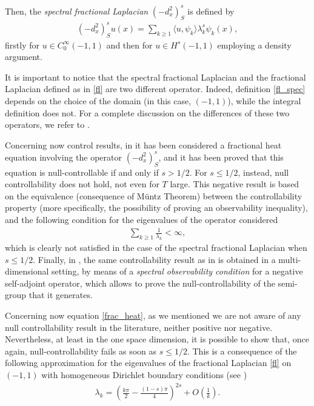 Then, the \textit{spectral fractional Laplacian} $(-d_x^2)^s_S$ is defined by
\begin{align}\label{fl_spec}
	(-d_x^2)^s_S u(x) = \sum_{k\geq 1}\langle u,\psi_k\rangle \lambda_k^s\psi_k(x),
\end{align}
firstly for $u\in C_0^{\infty}(-1,1)$ and then for $u\in H^s(-1,1)$ employing a density argument.

It is important to notice that the spectral fractional Laplacian and the fractional Laplacian defined as in \eqref{fl} are two different operator. Indeed, definition \eqref{fl_spec} depends on the choice of the domain (in this case, $(-1,1)$), while the integral definition does not. For a complete discussion on the differences of these two operators, we refer to \cite{servadei2014spectrum}.

Concerning now control results, in \cite{micu2006controllability} it has been considered a fractional heat equation involving the operator $(-d_x^2)^s_S$, and it has been proved that this equation is null-controllable if and only if $s>1/2$. For $s\leq 1/2$, instead, null controllability does not hold, not even for $T$ large. This negative result is based on the equivalence (consequence of M\"untz Theorem) between the controllability property (more specifically, the possibility of proving an observability inequality), and the following condition for the eigenvalues of the operator considered
\begin{align}\label{eigen_cond}
	\sum_{k\geq 1} \frac{1}{\lambda_k}<\infty,
\end{align} 
which is clearly not satisfied in the case of the spectral fractional Laplacian when $s\leq 1/2$. Finally, in \cite{miller2006controllability}, the same controllability result as in \cite{micu2006controllability} is obtained in a multi-dimensional setting, by means of a  \textit{spectral observability condition} for a negative self-adjoint operator, which allows to prove the null-controllability of the semi-group that it generates.

Concerning now equation \eqref{frac_heat}, as we mentioned we are not aware of any null controllability result in the literature, neither positive nor negative. Nevertheless, at least in the one space dimension, it is possible to show that, once again, null-controllability fails as soon as $s\leq 1/2$. This is a consequence of the following approximation for the eigenvalues of the fractional Laplacian \eqref{fl} on $(-1,1)$ with homogeneous Dirichlet boundary conditions (see \cite{kulczycki2010spectral,kwasnicki2012eigenvalues}) 
\begin{align}\label{eigen_approx}
	\lambda_k = \left(\frac{k\pi}{2}-\frac{(1-s)\pi}{4}\right)^{2s}+O\left(\frac{1}{k}\right).
\end{align} 

